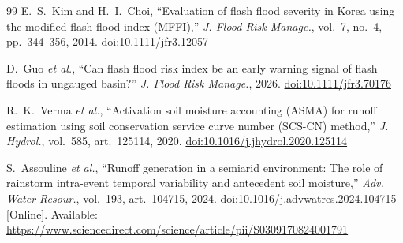 \documentclass[5p,twocolumn]{elsarticle}
\begin{document}
\begin{thebibliography}{99}
 E.~S.~Kim and H.~I.~Choi, ``Evaluation of flash flood severity in Korea using the modified flash flood index (MFFI),'' \textit{J. Flood Risk Manage.}, vol.~7, no.~4, pp.~344--356, 2014. \href{https://doi.org/10.1111/jfr3.12057}{doi:10.1111/jfr3.12057}

 D.~Guo \textit{et al.}, ``Can flash flood risk index be an early warning signal of flash floods in ungauged basin?'' \textit{J. Flood Risk Manage.}, 2026. \href{https://doi.org/10.1111/jfr3.70176}{doi:10.1111/jfr3.70176}

 R.~K.~Verma \textit{et al.}, ``Activation soil moisture accounting (ASMA) for runoff estimation using soil conservation service curve number (SCS-CN) method,'' \textit{J. Hydrol.}, vol.~585, art.~125114, 2020. \href{https://doi.org/10.1016/j.jhydrol.2020.125114}{doi:10.1016/j.jhydrol.2020.125114}

 S.~Assouline \textit{et al.}, ``Runoff generation in a semiarid environment: The role of rainstorm intra-event temporal variability and antecedent soil moisture,'' \textit{Adv. Water Resour.}, vol.~193, art.~104715, 2024. \href{https://doi.org/10.1016/j.advwatres.2024.104715}{doi:10.1016/j.advwatres.2024.104715} [Online]. Available: \url{https://www.sciencedirect.com/science/article/pii/S0309170824001791}


\end{thebibliography}
\end{document}
